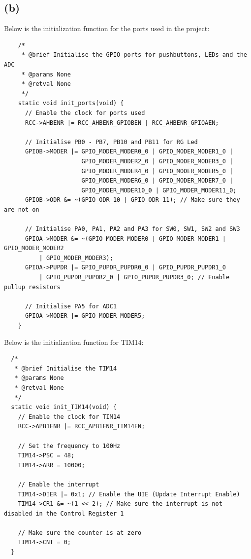 \subsection*{(b)}
\label{sub:(b)}
  Below is the initialization function for the ports used in the project: \\
  \begin{verbatim}
    /*
     * @brief Initialise the GPIO ports for pushbuttons, LEDs and the ADC
     * @params None
     * @retval None
     */
    static void init_ports(void) {
      // Enable the clock for ports used
      RCC->AHBENR |= RCC_AHBENR_GPIOBEN | RCC_AHBENR_GPIOAEN;

      // Initialise PB0 - PB7, PB10 and PB11 for RG Led
      GPIOB->MODER |= GPIO_MODER_MODER0_0 | GPIO_MODER_MODER1_0 |
                      GPIO_MODER_MODER2_0 | GPIO_MODER_MODER3_0 |
                      GPIO_MODER_MODER4_0 | GPIO_MODER_MODER5_0 |
                      GPIO_MODER_MODER6_0 | GPIO_MODER_MODER7_0 |
                      GPIO_MODER_MODER10_0 | GPIO_MODER_MODER11_0;
      GPIOB->ODR &= ~(GPIO_ODR_10 | GPIO_ODR_11); // Make sure they are not on

      // Initialise PA0, PA1, PA2 and PA3 for SW0, SW1, SW2 and SW3
      GPIOA->MODER &= ~(GPIO_MODER_MODER0 | GPIO_MODER_MODER1 | GPIO_MODER_MODER2
          | GPIO_MODER_MODER3);
      GPIOA->PUPDR |= GPIO_PUPDR_PUPDR0_0 | GPIO_PUPDR_PUPDR1_0
          | GPIO_PUPDR_PUPDR2_0 | GPIO_PUPDR_PUPDR3_0; // Enable pullup resistors

      // Initialise PA5 for ADC1
      GPIOA->MODER |= GPIO_MODER_MODER5;
    }
  \end{verbatim}
\vspace{0.5cm}

Below is the initialization function for TIM14:\\

\begin{verbatim}
  /*
   * @brief Initialise the TIM14
   * @params None
   * @retval None
   */
  static void init_TIM14(void) {
    // Enable the clock for TIM14
    RCC->APB1ENR |= RCC_APB1ENR_TIM14EN;

    // Set the frequency to 100Hz
    TIM14->PSC = 48;
    TIM14->ARR = 10000;

    // Enable the interrupt
    TIM14->DIER |= 0x1; // Enable the UIE (Update Interrupt Enable)
    TIM14->CR1 &= ~(1 << 2); // Make sure the interrupt is not disabled in the Control Register 1

    // Make sure the counter is at zero
    TIM14->CNT = 0;
  }
\end{verbatim}
\vspace{0.5cm}

